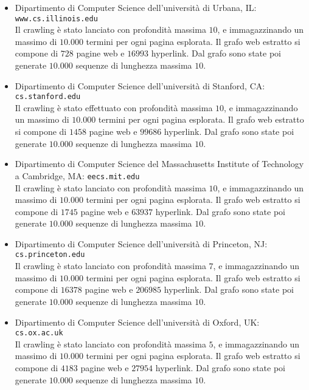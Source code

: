 \begin{itemize}

\item Dipartimento di Computer Science dell'università di Urbana, IL:\\
\texttt{www.cs.illinois.edu}\\
Il crawling è stato lanciato con profondità massima $10$, e immagazzinando un massimo di $10.000$ termini per ogni pagina esplorata. Il grafo web estratto si compone di $728$ pagine web e $16993$ hyperlink. Dal grafo sono state poi generate $10.000$ sequenze di lunghezza massima $10$.

\item Dipartimento di Computer Science dell'università di Stanford, CA: \texttt{cs.stanford.edu} \\Il crawling è stato effettuato con profondità massima $10$, e immagazzinando un massimo di $10.000$ termini per ogni pagina esplorata. Il grafo web estratto si compone di $1458$ pagine web e $99686$ hyperlink. Dal grafo sono state poi generate $10.000$ sequenze di lunghezza massima $10$.

\item Dipartimento di Computer Science del  Massachusetts Institute of Technology a Cambridge, MA: \texttt{eecs.mit.edu} \\ Il crawling è stato lanciato con profondità massima $10$, e immagazzinando un massimo di $10.000$ termini per ogni pagina esplorata. Il grafo web estratto si compone di $1745$ pagine web e $63937$ hyperlink. Dal grafo sono state poi generate $10.000$ sequenze di lunghezza massima $10$.

\item Dipartimento di Computer Science dell'università di Princeton, NJ: \texttt{cs.princeton.edu} \\ Il crawling è stato lanciato con profondità massima $7$, e immagazzinando un massimo di $10.000$ termini per ogni pagina esplorata. Il grafo web estratto si compone di $16378$ pagine web e $206985$ hyperlink. Dal grafo sono state poi generate $10.000$ sequenze di lunghezza massima $10$.

\item Dipartimento di Computer Science dell'università di Oxford, UK: \texttt{cs.ox.ac.uk} \\ Il crawling è stato lanciato con profondità massima $5$, e immagazzinando un massimo di $10.000$ termini per ogni pagina esplorata. Il grafo web estratto si compone di $4183$ pagine web e $27954$ hyperlink. Dal grafo sono state poi generate $10.000$ sequenze di lunghezza massima $10$.

\end{itemize}

